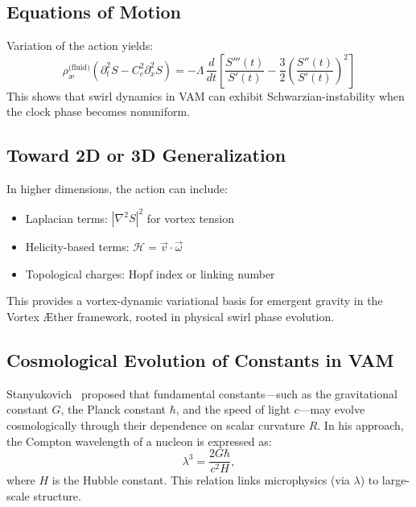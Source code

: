 \documentclass[preprint]{revtex4-2}
\begin{document}
            \subsection{Equations of Motion}
            Variation of the action yields:
            \begin{equation}
            \rho_{\text{\ae}}^{\text{(fluid)}} (\partial_t^2 S - C_e^2 \partial_x^2 S) = - \Lambda \, \frac{d}{dt} \left[ \frac{S'''(t)}{S'(t)} - \frac{3}{2} \left( \frac{S''(t)}{S'(t)} \right)^2 \right]
            \end{equation}
            This shows that swirl dynamics in VAM can exhibit Schwarzian-instability when the clock phase becomes nonuniform.

            \subsection*{Toward 2D or 3D Generalization}
            In higher dimensions, the action can include:
            \begin{itemize}
            \item Laplacian terms: $|\nabla^2 S|^2$ for vortex tension
            \item Helicity-based terms: $\mathcal{H} = \vec{v} \cdot \vec{\omega}$
            \item Topological charges: Hopf index or linking number
            \end{itemize}

            This provides a vortex-dynamic variational basis for emergent gravity in the Vortex \AE ther framework, rooted in physical swirl phase evolution.

            \subsection{Cosmological Evolution of Constants in VAM}
            Stanyukovich~\cite{stanyukovich2008evolution} proposed that fundamental constants—such as the gravitational constant $G$, the Planck constant $\hbar$, and the speed of light $c$—may evolve cosmologically through their dependence on scalar curvature $R$. In his approach, the Compton wavelength of a nucleon is expressed as:
            \begin{equation}
            \lambda^3 = \frac{2G\hbar}{c^2 H},
            \end{equation}
            where $H$ is the Hubble constant. This relation links microphysics (via $\lambda$) to large-scale structure.
\end{document}

